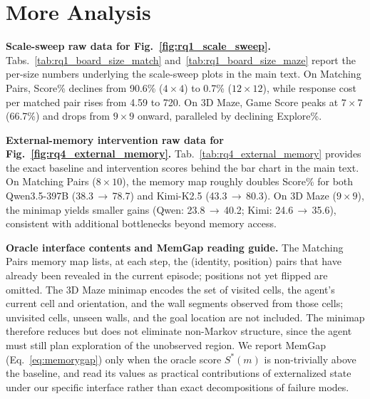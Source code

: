 \section{More Analysis} \label{sec:appendix_ablation}

\noindent\textbf{Scale-sweep raw data for Fig.~\ref{fig:rq1_scale_sweep}.}
Tabs.~\ref{tab:rq1_board_size_match} and~\ref{tab:rq1_board_size_maze} report the per-size numbers underlying the scale-sweep plots in the main text. On Matching Pairs, Score\% declines from 90.6\% ($4{\times}4$) to 0.7\% ($12{\times}12$), while response cost per matched pair rises from 4.59 to 720. On 3D Maze, Game Score peaks at $7{\times}7$ (66.7\%) and drops from $9{\times}9$ onward, paralleled by declining Explore\%.



\noindent\textbf{External-memory intervention raw data for Fig.~\ref{fig:rq4_external_memory}.}
Tab.~\ref{tab:rq4_external_memory} provides the exact baseline and intervention scores behind the bar chart in the main text. On Matching Pairs ($8{\times}10$), the memory map roughly doubles Score\% for both Qwen3.5-397B (38.3\,$\to$\,78.7) and Kimi-K2.5 (43.3\,$\to$\,80.3). On 3D Maze ($9{\times}9$), the minimap yields smaller gains (Qwen: 23.8\,$\to$\,40.2; Kimi: 24.6\,$\to$\,35.6), consistent with additional bottlenecks beyond memory access.

\noindent\textbf{Oracle interface contents and MemGap reading guide.}
The Matching Pairs memory map lists, at each step, the (identity, position) pairs that have already been revealed in the current episode; positions not yet flipped are omitted. The 3D Maze minimap encodes the set of visited cells, the agent's current cell and orientation, and the wall segments observed from those cells; unvisited cells, unseen walls, and the goal location are not included. The minimap therefore reduces but does not eliminate non-Markov structure, since the agent must still plan exploration of the unobserved region. We report MemGap (Eq.~\ref{eq:memorygap}) only when the oracle score $S^*(m)$ is non-trivially above the baseline, and read its values as practical contributions of externalized state under our specific interface rather than exact decompositions of failure modes.



\begin{table}[tbp]
\centering
\hfill

\end{table}

